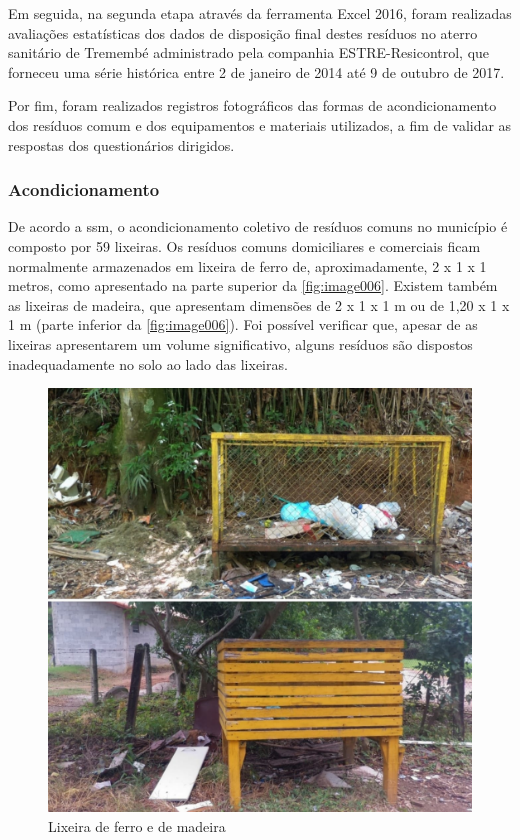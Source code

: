 	Em seguida, na segunda etapa através da ferramenta Excel 2016, foram realizadas avaliações estatísticas dos dados de disposição final destes resíduos no aterro sanitário de Tremembé administrado pela companhia ESTRE-Resicontrol, que forneceu uma série histórica entre 2 de janeiro de 2014 até 9 de outubro de 2017.
	
	Por fim, foram realizados registros fotográficos das formas de acondicionamento dos resíduos comum e dos equipamentos e materiais utilizados, a fim de validar as respostas dos questionários dirigidos.
	
	\subsubsection{Acondicionamento}
	
	De acordo a \gls{ssm}, o acondicionamento coletivo de resíduos comuns no município é composto por 59 lixeiras. Os resíduos comuns domiciliares e comerciais ficam normalmente armazenados em lixeira de ferro de, aproximadamente, 2 x 1 x 1 metros, como apresentado na parte superior da \autoref{fig:image006}. Existem também as lixeiras de madeira, que apresentam dimensões de 2 x 1 x 1 m ou de 1,20 x 1 x 1 m (parte inferior da \autoref{fig:image006}). Foi possível verificar que, apesar de as lixeiras apresentarem um volume significativo, alguns resíduos são dispostos inadequadamente no solo ao lado das lixeiras. 
	
	\begin{figure}[h!]
		\centering
		\includegraphics[width=0.75\linewidth]{produtos/prodtres/image006}
		\caption{Lixeira de ferro e de madeira}
		\label{fig:image006}
	\end{figure}
	
